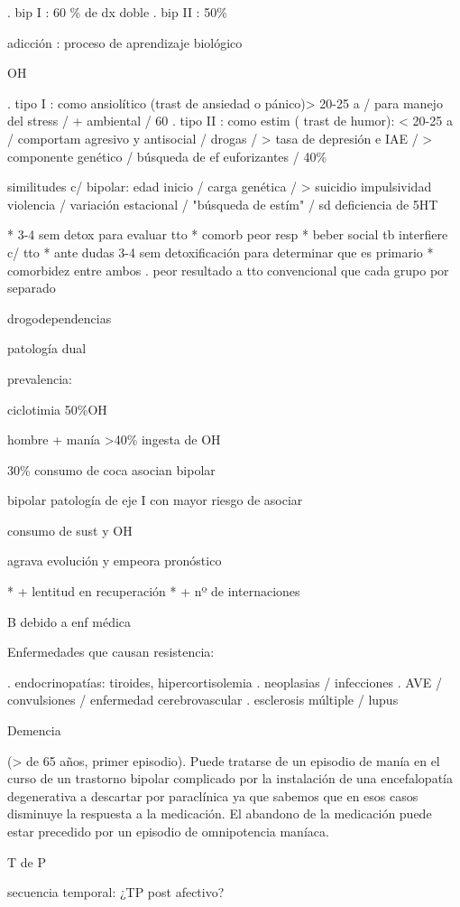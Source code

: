 . bip I : 60 \% de dx doble
. bip II : 50\%

adicción : proceso de aprendizaje biológico

OH

. tipo I : como ansiolítico (trast de ansiedad o pánico)> 20-25 a / para manejo del stress / + ambiental / 60%
. tipo II : como estim ( trast de humor): < 20-25 a / comportam agresivo y antisocial / drogas / > tasa de depresión e IAE / > componente genético / búsqueda de ef euforizantes / 40\%

similitudes c/ bipolar: edad inicio / carga genética / > suicidio impulsividad violencia / variación estacional / "búsqueda de estím" / sd deficiencia de 5HT

* 3-4 sem detox para evaluar tto
* comorb peor resp
* beber social tb interfiere c/ tto
* ante dudas 3-4 sem detoxificación para determinar que es primario
* comorbidez entre ambos . peor resultado a tto convencional que cada grupo por separado

drogodependencias

patología dual

prevalencia:

ciclotimia 50\%OH

hombre + manía >40\% ingesta de OH

30\% consumo de coca asocian bipolar

bipolar patología de eje I con mayor riesgo de asociar

consumo de sust y OH

agrava evolución y empeora pronóstico

* + lentitud en recuperación
* + nº de internaciones

B debido a enf médica

Enfermedades que causan resistencia:

. endocrinopatías: tiroides, hipercortisolemia
. neoplasias / infecciones
. AVE / convulsiones / enfermedad cerebrovascular
. esclerosis múltiple / lupus

Demencia

(> de 65 años, primer episodio). Puede tratarse de un episodio de manía en el curso de un trastorno bipolar complicado por la instalación de una encefalopatía degenerativa a descartar por paraclínica ya que sabemos que en esos casos disminuye la respuesta a la medicación. El abandono de la medicación puede estar precedido por un episodio de omnipotencia maníaca.

T de P

secuencia temporal: ¿TP post afectivo?

